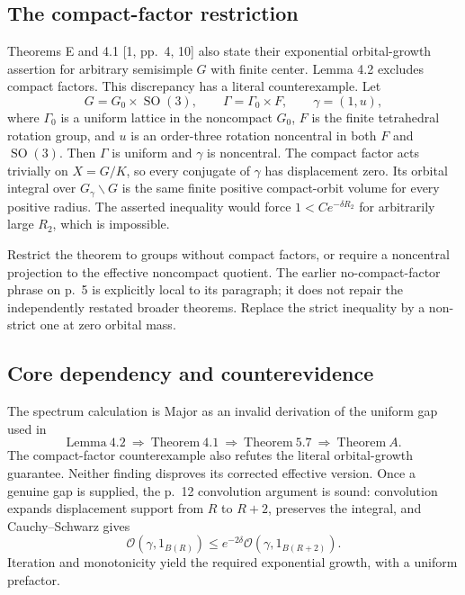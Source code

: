 \documentclass[10pt]{article}
\begin{document}
\subsection*{The compact-factor restriction}
Theorems E and 4.1 [1, pp. 4, 10] also state their exponential orbital-growth assertion for arbitrary semisimple \(G\) with finite center. Lemma 4.2 excludes compact factors. This discrepancy has a literal counterexample. Let \[G=G_0\times\operatorname{SO}(3),\qquad
 \Gamma=\Gamma_0\times F,
 \qquad \gamma=(1,u),\] where \(\Gamma_0\) is a uniform lattice in the noncompact \(G_0\), \(F\) is the finite tetrahedral rotation group, and \(u\) is an order-three rotation noncentral in both \(F\) and \(\operatorname{SO}(3)\). Then \(\Gamma\) is uniform and \(\gamma\) is noncentral. The compact factor acts trivially on \(X=G/K\), so every conjugate of \(\gamma\) has displacement zero. Its orbital integral over \(G_\gamma\backslash G\) is the same finite positive compact-orbit volume for every positive radius. The asserted inequality would force \(1<C e^{-\delta R_2}\) for arbitrarily large \(R_2\), which is impossible.\par
Restrict the theorem to groups without compact factors, or require a noncentral projection to the effective noncompact quotient. The earlier no-compact-factor phrase on p. 5 is explicitly local to its paragraph; it does not repair the independently restated broader theorems. Replace the strict inequality by a non-strict one at zero orbital mass.\par
\subsection*{Core dependency and counterevidence}
The spectrum calculation is Major as an invalid derivation of the uniform gap used in \[\mathrm{Lemma}\ 4.2\ \Longrightarrow\ \mathrm{Theorem}\ 4.1\
 \Longrightarrow\ \mathrm{Theorem}\ 5.7\ \Longrightarrow\ \mathrm{Theorem}\ A.\] The compact-factor counterexample also refutes the literal orbital-growth guarantee. Neither finding disproves its corrected effective version. Once a genuine gap is supplied, the p. 12 convolution argument is sound: convolution expands displacement support from \(R\) to \(R+2\), preserves the integral, and Cauchy–Schwarz gives \[\mathcal O(\gamma,1_{B(R)})\le e^{-2\delta}\mathcal O(\gamma,1_{B(R+2)}).\] Iteration and monotonicity yield the required exponential growth, with a uniform prefactor.\par
\end{document}
